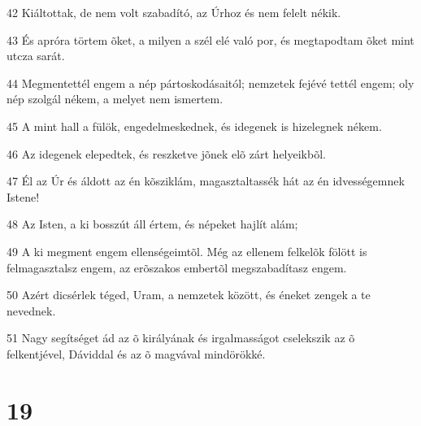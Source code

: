 \par 42 Kiáltottak, de nem volt szabadító, az Úrhoz és nem felelt nékik.
\par 43 És apróra törtem õket, a milyen a szél elé való por, és megtapodtam õket mint utcza sarát.
\par 44 Megmentettél engem a nép pártoskodásaitól; nemzetek fejévé tettél engem; oly nép szolgál nékem, a melyet nem ismertem.
\par 45 A mint hall a fülök, engedelmeskednek, és idegenek is hizelegnek nékem.
\par 46 Az idegenek elepedtek, és reszketve jõnek elõ zárt helyeikbõl.
\par 47 Él az Úr és áldott az én kõsziklám, magasztaltassék hát az én idvességemnek Istene!
\par 48 Az Isten, a ki bosszút áll értem, és népeket hajlít alám;
\par 49 A ki megment engem ellenségeimtõl. Még az ellenem felkelõk fölött is felmagasztalsz engem, az erõszakos embertõl megszabadítasz engem.
\par 50 Azért dicsérlek téged, Uram, a nemzetek között, és éneket zengek a te nevednek.
\par 51 Nagy segítséget ád az õ királyának és irgalmasságot cselekszik az õ felkentjével, Dáviddal és az õ magvával mindörökké.

\chapter{19}

